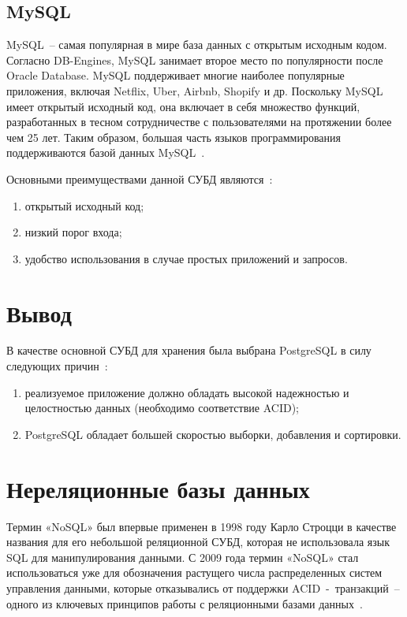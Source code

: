 \subsection{MySQL}

MySQL~-- самая популярная в мире база данных с открытым исходным кодом.
Согласно DB-Engines, MySQL занимает второе место по популярности после Oracle Database.
MySQL поддерживает многие наиболее популярные приложения, включая Netflix, Uber, Airbnb, Shopify и др.
Поскольку MySQL имеет открытый исходный код, она включает в себя множество функций, разработанных в тесном сотрудничестве с пользователями на протяжении более чем 25 лет.
Таким образом, большая часть языков программирования поддерживаются базой данных MySQL~\cite{mysql}.

Основными преимуществами данной СУБД являются~\cite{cmpSCDB1, cmpSCDB2, cmpSCDB3}:
\begin{enumerate}
	\item открытый исходный код;
	\item низкий порог входа;
	\item удобство использования в случае простых приложений и запросов.
\end{enumerate}

\section*{Вывод}

В качестве основной СУБД для хранения была выбрана PostgreSQL в силу следующих причин~\cite{cmpSCDB4}:
\begin{enumerate}
	\item реализуемое приложение должно обладать высокой надежностью и целостностью данных (необходимо соответствие ACID);
	\item PostgreSQL обладает большей скоростью выборки, добавления и сортировки.
\end{enumerate}

\section{Нереляционные базы данных}

Термин «NoSQL» был впервые применен в 1998 году Карло Строцци в качестве названия для его небольшой реляционной СУБД, которая не использовала язык SQL для манипулирования данными.
С 2009 года термин «NoSQL» стал использоваться уже для обозначения растущего числа распределенных систем управления данными, которые отказывались от поддержки ACID~-~транзакций~-- одного из ключевых принципов работы с реляционными базами данных~\cite{nosql}.

